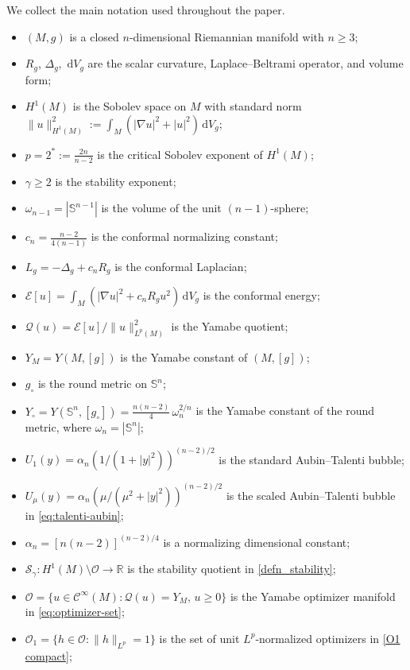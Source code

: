 \documentclass[reqno,11pt]{amsart}
\numberwithin{equation}{section}
\theoremstyle{definition}
\theoremstyle{remark}
\newcommand{\ud}{\,\mathrm{d}}
\newcommand{\R}{\mathbb{R}}
\newcommand{\Ss}{\mathbb{S}}
\begin{document}
We collect the main notation used throughout the paper.
\begin{itemize}[leftmargin=2em, itemsep=2pt]
\item[--] $(M, g)$ is a closed $n$-dimensional Riemannian manifold with $n \geqslant 3$;
\item[--] $R_g$, $\Delta_g$, $\ud V_g$ are the scalar curvature, Laplace--Beltrami operator, and volume form;
\item[--] $H^1(M)$ is the Sobolev space on $M$ with standard norm $\|u\|_{H^1(M)}^2 := \int_M (|\nabla u|^2 + |u|^2) \ud V_g$;
\item[--] $p = 2^*:= \tfrac{2n}{n-2}$ is the critical Sobolev exponent of $H^1(M)$;
\item[--] $\gamma \geqslant 2$ is the stability exponent;
\item[--] $\omega_{n-1} = |\Ss^{n-1}|$ is the volume of the unit $(n-1)$-sphere;
\item[--] $c_n = \tfrac{n-2}{4(n-1)}$ is the conformal normalizing constant;
\item[--] $L_g = -\Delta_g + c_n R_g$ is the conformal Laplacian;
\item[--] $\mathcal{E}[u] = \int_M(|\nabla u|^2 + c_n R_g u^2)\ud V_g$ is the conformal energy;
\item[--] $\mathcal{Q}(u) = \mathcal{E}[u]/\|u\|_{L^p(M)}^2$ is the Yamabe quotient;
\item[--] $Y_M = Y(M,[g])$ is the Yamabe constant of $(M,[g])$;
\item[--] $g_\circ$ is the round metric on $\Ss^n$;
\item[--] $Y_\circ = Y(\Ss^n,[g_\circ]) = \tfrac{n(n-2)}{4}\,\omega_n^{2/n}$ is the Yamabe constant of the round 
metric, where $\omega_n = |\Ss^n|$;
\item[--] $U_1(y) = \alpha_n(1/(1+|y|^2))^{(n-2)/2}$ is the standard Aubin--Talenti bubble;
\item[--] $U_\mu(y) = \alpha_n(\mu/(\mu^2+|y|^2))^{(n-2)/2}$ is the scaled Aubin--Talenti bubble in \eqref{eq:talenti-aubin};
\item[--] $\alpha_n = [n(n-2)]^{(n-2)/4}$ is a normalizing dimensional constant;
\item[--] $\mathcal{S}_\gamma: H^1(M)\setminus \mathscr{O}\to\R$ is the stability quotient in \eqref{defn_stability};
\item[--] $\mathscr{O} = \{ u \in \mathcal{C}^\infty(M) : \mathcal{Q}(u) = Y_M,\, u \geqslant 0 \}$ is the Yamabe optimizer manifold in \eqref{eq:optimizer-set};
\item[--]  $\mathscr{O}_1 = \{ h \in \mathscr{O} : \|h\|_{L^p} = 1 \}$ is the set of unit $L^p$-normalized optimizers in \eqref{O1 compact};

\end{itemize}
\end{document}
